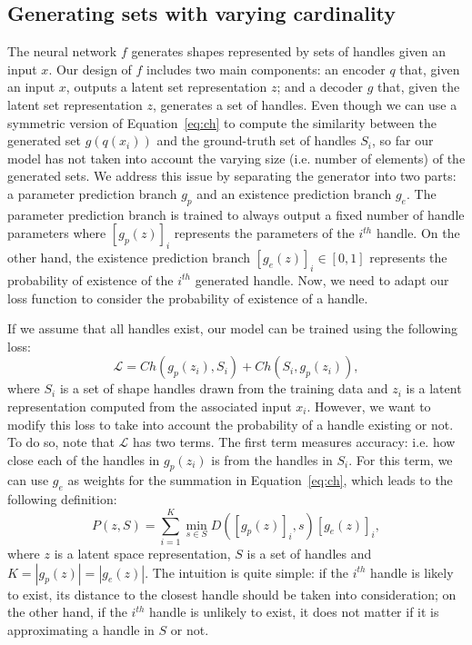 \subsection{Generating sets with varying cardinality}
\label{sec:cardinality}
The neural network $f$ generates shapes represented by sets of handles given an input $x$.
Our design of $f$ includes two main components: an encoder $q$ that, given an input $x$, outputs a latent set representation
$z$; and a decoder $g$ that, given the latent set representation $z$, generates
a set of handles.
Even though we can use a symmetric version of Equation~\ref{eq:ch} 
to compute the similarity between the generated set $g(q(x_i))$ 
and the ground-truth set of handles $S_i$, 
so far our model has not taken into account the varying size (i.e. number of elements) of the generated sets.
We address this issue by separating the generator into two parts: a parameter prediction
branch $g_p$ and an existence prediction branch $g_e$. The parameter prediction branch is trained to always output a fixed number of handle parameters where
$[g_p(z)]_i$ represents the parameters of the $i^{th}$ handle. On the other hand, the existence prediction branch $[g_e(z)]_i \in [0,1]$ represents the probability of existence of the $i^{th}$
generated handle.
Now, we need to adapt our loss function to consider the probability of
existence of a handle.

If we assume that all handles exist, our model can be trained using the following
loss: %
$$
\mathcal{L} = Ch(g_p(z_i), S_i) + Ch(S_i, g_p(z_i)),
$$
where $S_i$ is a set of shape handles drawn from the training data and
$z_i$ is a latent representation computed from the associated input $x_i$.
However, we want to modify this loss to take into account the probability of a handle existing
or not. To do so, note that $\mathcal{L}$ has two terms.
The first term measures accuracy: i.e. how close each of the handles in $g_p(z_i)$ is from the handles
in $S_i$.
For this term, we can use $g_e$ as weights for the summation in Equation~\ref{eq:ch},
which leads to the following definition:
\begin{equation}
\label{eq:prec}
P(z, S) = \sum_{i=1}^K \min_{s \in S} D([g_p(z)]_i, s)[g_e(z)]_i,
\end{equation}
where $z$ is a latent space representation,  $S$ is a set of handles and
$K = |g_p(z)| = |g_e(z)|$.
The intuition is quite simple:
if the $i^{th}$ handle is likely to exist, its distance to the closest handle should be taken into consideration;
on the other hand, if the $i^{th}$ handle is unlikely to exist, it does not matter if
it is approximating a handle in $S$ or not.

